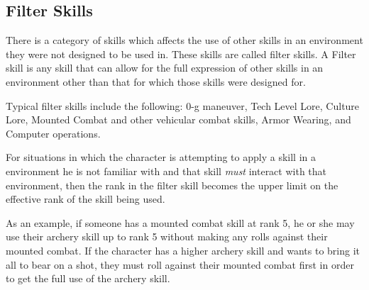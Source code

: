 \subsection{Filter Skills}

There is a category of skills which affects the use of other skills 
in an environment they were not designed to be used in. These skills 
are called filter skills. A Filter skill is any skill that can allow 
for the full expression of other skills in an environment other than 
that for which those skills were designed for.

Typical filter skills include the following: 0-g maneuver, Tech 
Level Lore, Culture Lore, Mounted Combat and other vehicular combat 
skills, Armor Wearing, and Computer operations.

For situations in which the character is attempting to apply a skill 
in a environment he is not familiar with and that skill {\em must }
interact with that environment, then the rank in the filter skill 
becomes the upper limit on the effective rank of the skill being 
used.

As an example, if someone has a mounted combat skill at rank 5, he or she
may use their archery skill up to rank 5 without making any rolls
against their mounted combat. If the character has a higher archery skill
and wants to bring it all to bear on a shot, they must roll against
their mounted combat first in order to get the full use of the archery
skill.

